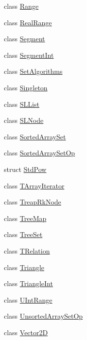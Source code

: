 \begin{DoxyCompactItemize}
class \hyperlink{class_designar_1_1_range}{Range}
\item 
class \hyperlink{class_designar_1_1_real_range}{Real\+Range}
\item 
class \hyperlink{class_designar_1_1_segment}{Segment}
\item 
class \hyperlink{class_designar_1_1_segment_int}{Segment\+Int}
\item 
class \hyperlink{class_designar_1_1_set_algorithms}{Set\+Algorithms}
\item 
class \hyperlink{class_designar_1_1_singleton}{Singleton}
\item 
class \hyperlink{class_designar_1_1_s_l_list}{S\+L\+List}
\item 
class \hyperlink{class_designar_1_1_s_l_node}{S\+L\+Node}
\item 
class \hyperlink{class_designar_1_1_sorted_array_set}{Sorted\+Array\+Set}
\item 
class \hyperlink{class_designar_1_1_sorted_array_set_op}{Sorted\+Array\+Set\+Op}
\item 
struct \hyperlink{struct_designar_1_1_std_pow}{Std\+Pow}
\item 
class \hyperlink{class_designar_1_1_t_array_iterator}{T\+Array\+Iterator}
\item 
class \hyperlink{class_designar_1_1_treap_rk_node}{Treap\+Rk\+Node}
\item 
class \hyperlink{class_designar_1_1_tree_map}{Tree\+Map}
\item 
class \hyperlink{class_designar_1_1_tree_set}{Tree\+Set}
\item 
class \hyperlink{class_designar_1_1_t_relation}{T\+Relation}
\item 
class \hyperlink{class_designar_1_1_triangle}{Triangle}
\item 
class \hyperlink{class_designar_1_1_triangle_int}{Triangle\+Int}
\item 
class \hyperlink{class_designar_1_1_u_int_range}{U\+Int\+Range}
\item 
class \hyperlink{class_designar_1_1_unsorted_array_set_op}{Unsorted\+Array\+Set\+Op}
\item 
class \hyperlink{class_designar_1_1_vector2_d}{Vector2D}
\end{DoxyCompactItemize}
